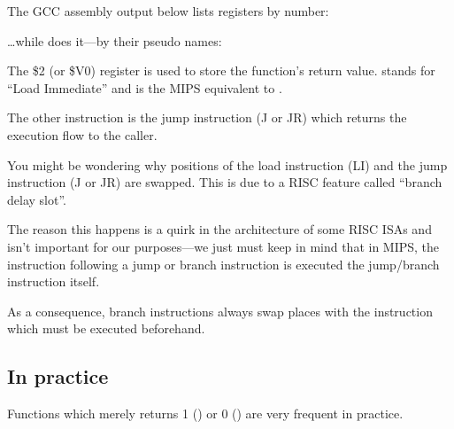 The GCC assembly output below lists registers by number:



\dots while \IDA does it---by their pseudo names:



The \$2 (or \$V0) register is used to store the function's return value.
 stands for ``Load Immediate'' and is the MIPS equivalent to \MOV.

The other instruction is the jump instruction (J or JR) which returns the execution flow to the \gls{caller}.

You might be wondering why positions of the load instruction (LI) and the jump instruction (J or JR) are swapped. This is due to a \ac{RISC} feature called ``branch delay slot''.

The reason this happens is a quirk in the architecture of some RISC \ac{ISA}s and isn't important for our purposes---we just must keep in mind that in MIPS, the instruction following a jump or branch instruction
is executed  the jump/branch instruction itself.

As a consequence, branch instructions always swap places with the instruction which must be executed beforehand.

\subsection{In practice}

Functions which merely returns 1 () or 0 () are very frequent in practice.

